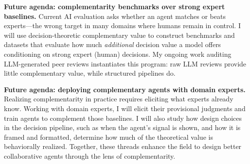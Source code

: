 

\newcommand*\circled[1]{\tikz[baseline=(char.base)]{
    \node[shape=circle, fill=black, text=white, inner sep=1.5pt, minimum size=5pt] (char) {#1};}}

\textbf{Future agenda: complementarity benchmarks over strong expert baselines.} 
Current AI evaluation asks whether an agent matches or beats experts---the wrong target in many domains where humans remain in control. 
I will use decision-theoretic complementary value to construct benchmarks and datasets that evaluate how much \emph{additional} decision value a model offers conditioning on strong expert (human) decisions.
My ongoing work auditing LLM-generated peer reviews instantiates this program: raw LLM reviews provide little complementary value, while structured pipelines do.
 
\textbf{Future agenda: deploying complementary agents with domain experts.} 
Realizing complementarity in practice requires eliciting what experts already know. 
Working with domain experts, I will elicit their provisional judgments and train agents to complement those baselines.
I will also study how design choices in the decision pipeline, such as when the agent's signal is shown, and how it is framed and formatted, determine how much of the theoretical value is behaviorally realized.
Together, these threads enhance the field to design better collaborative agents through the lens of complementarity.